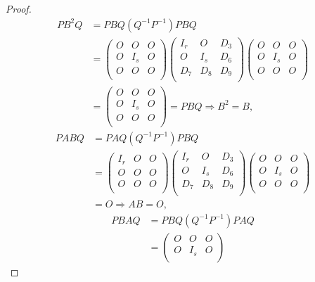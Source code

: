 \documentclass[../../main.tex]{subfiles}%
\begin{document}
\begin{proof}
\begin{align*}
PB^2Q&=PBQ\left( Q^{-1}P^{-1} \right) PBQ\\
&=\begin{pmatrix}
O&	O&	O\\
O&	I_s&	O\\
O&	O&	O\\
\end{pmatrix} \begin{pmatrix}
I_r&	O&	D_3\\
O&	I_s&	D_6\\
D_7&	D_8&	D_9\\
\end{pmatrix} \begin{pmatrix}
O&	O&	O\\
O&	I_s&	O\\
O&	O&	O\\
\end{pmatrix}\\
&=\begin{pmatrix}
O&	O&	O\\
O&	I_s&	O\\
O&	O&	O\\
\end{pmatrix}=PBQ\Longrightarrow B^2=B,
\end{align*}
\begin{align*}
PABQ&=PAQ\left( Q^{-1}P^{-1} \right) PBQ\\
&=\begin{pmatrix}
I_r&	O&	O\\
O&	O&	O\\
O&	O&	O\\
\end{pmatrix} \begin{pmatrix}
I_r&	O&	D_3\\
O&	I_s&	D_6\\
D_7&	D_8&	D_9\\
\end{pmatrix} \begin{pmatrix}
O&	O&	O\\
O&	I_s&	O\\
O&	O&	O\\
\end{pmatrix}\\
&=O\Longrightarrow AB=O,
\end{align*}
\begin{align*}
PBAQ&=PBQ\left( Q^{-1}P^{-1} \right) PAQ\\
&=\begin{pmatrix}
O&	O&	O\\
O&	I_s&	O\\

\end{pmatrix}
\end{align*}
\end{proof}
\end{document}
